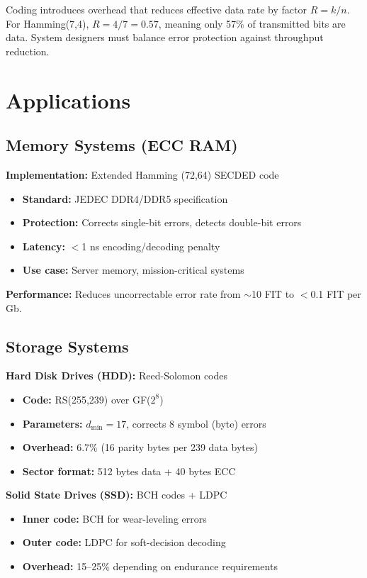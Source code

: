 \begin{warningbox}
Coding introduces overhead that reduces effective data rate by factor $R = k/n$. For Hamming(7,4), $R = 4/7 = 0.57$, meaning only 57\% of transmitted bits are data. System designers must balance error protection against throughput reduction.
\end{warningbox}

\section{Applications}

\subsection{Memory Systems (ECC RAM)}

\textbf{Implementation:} Extended Hamming (72,64) SECDED code
\begin{itemize}
\item \textbf{Standard:} JEDEC DDR4/DDR5 specification
\item \textbf{Protection:} Corrects single-bit errors, detects double-bit errors
\item \textbf{Latency:} $<$1 ns encoding/decoding penalty
\item \textbf{Use case:} Server memory, mission-critical systems
\end{itemize}

\textbf{Performance:} Reduces uncorrectable error rate from $\sim$10 FIT to $<$0.1 FIT per Gb.

\subsection{Storage Systems}

\textbf{Hard Disk Drives (HDD):} Reed-Solomon codes
\begin{itemize}
\item \textbf{Code:} RS(255,239) over GF($2^8$)
\item \textbf{Parameters:} $d_{\min} = 17$, corrects 8 symbol (byte) errors
\item \textbf{Overhead:} 6.7\% (16 parity bytes per 239 data bytes)
\item \textbf{Sector format:} 512 bytes data + 40 bytes ECC
\end{itemize}

\textbf{Solid State Drives (SSD):} BCH codes + LDPC
\begin{itemize}
\item \textbf{Inner code:} BCH for wear-leveling errors
\item \textbf{Outer code:} LDPC for soft-decision decoding
\item \textbf{Overhead:} 15--25\% depending on endurance requirements
\end{itemize}

